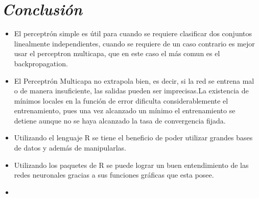 \documentclass[journal]{IEEEtran}
\begin{document}
\section{\textbf{\emph{Conclusión}}}

\begin{itemize}
\item El perceptrón simple es útil para cuando se requiere clasificar dos conjuntos linealmente independientes, cuando se requiere de un caso contrario es mejor usar el perceptron multicapa, que en este caso el más comun es el backpropagation.

\item El Perceptrón Multicapa no extrapola bien, es decir, si la red se entrena mal o de manera insuficiente, las salidas pueden ser imprecisas.La existencia de mínimos locales en la función de error dificulta considerablemente el entrenamiento, pues una vez alcanzado un mínimo el entrenamiento se detiene aunque no se haya alcanzado la tasa de convergencia fijada.

\item Utilizando el lenguaje R se tiene el beneficio de poder utilizar grandes bases de datos y además de manipularlas.
        
\item Utilizando los paquetes de R se puede lograr un buen entendimiento de las redes neuronales gracias a sus funciones gráficas que esta posee.

\item 
\end{itemize}
\end{document}
